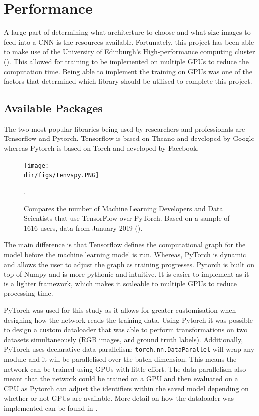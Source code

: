 \section{Performance}
A large part of determining what architecture to choose and what size images to feed into a CNN is the resources available. Fortunately, this project has been able to make use of the University of Edinburgh's High-performance computing cluster (\cite{ecdf19}). This allowed for training to be implemented on multiple GPUs to reduce the computation time. Being able to implement the training on GPUs was one of the factors that determined which library should be utilised to complete this project.
\subsection{Available Packages}
The two most popular libraries being used by researchers and professionals are Tensorflow and Pytorch. Tensorflow is based on Theano and developed by Google whereas Pytorch is based on Torch and developed by Facebook.
\begin{figure}[htpb]
    \centering
    \texttt{[image: \\dir/figs/tenvspy.PNG]}
    \caption[TensorFlow versus PyTorch Usage]{Compares the number of Machine Learning Developers and Data Scientists that use TensorFlow over PyTorch. Based on a sample of 1616 users, data from January 2019 (\cite{Rosenzvaig19}). }.
    \label{fig.tfvspy}
\end{figure}
The main difference is that Tensorflow defines the computational graph for the model before the machine learning model is run. Whereas, PyTorch is dynamic and allows the user to adjust the graph as training progresses. Pytorch is built on top of Numpy and is more pythonic and intuitive. It is easier to implement as it is a lighter framework, which makes it scaleable to multiple GPUs to reduce processing time.
\par
PyTorch was used for this study as it allows for greater customisation when designing how the network reads the training data. Using Pytorch it was possible to design a custom dataloader that was able to perform transformations on two datasets simultaneously (RGB images, and ground truth labels). Additionally, PyTorch uses declarative data parallelism:  \texttt{torch.nn.DataParallel} will wrap any module and it will be parallelised over the batch dimension. This means the network can be trained using GPUs with little effort. The data parallelism also meant that the network could be trained on a GPU and then evaluated on a CPU as Pytorch can adjust the identifiers within the saved model depending on whether or not GPUs are available. More detail on how the dataloader was implemented can be found in \citet{Richmond19b}.